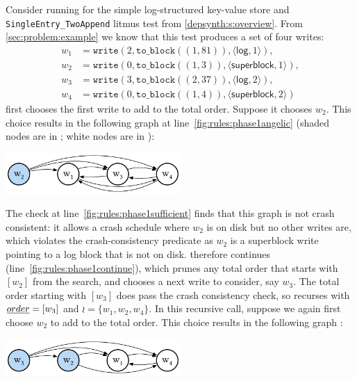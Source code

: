 \begin{example}\label{sec:alg:example}
  \normalfont
Consider running  for the simple log-structured key-value store
and \texttt{SingleEntry_TwoAppend} litmus test from \cref{depsynth:s:overview}.
From \cref{sec:problem:example} we know that this test produces a set \wr of four writes:
%
\begin{align*}
    w_1 &= \texttt{write}(2, \texttt{to_block}((1, 81)), \langle \textsf{log}, 1 \rangle), \\
    w_2 &= \texttt{write}(0, \texttt{to_block}((1, 3)),  \langle \textsf{superblock}, 1 \rangle), \\
    w_3 &= \texttt{write}(3, \texttt{to_block}((2, 37)), \langle \textsf{log}, 2 \rangle), \\
    w_4 &= \texttt{write}(0, \texttt{to_block}((1, 4)),  \langle \textsf{superblock}, 2 \rangle)
\end{align*}
%
\phaseone first chooses the first write to add to the total order.
Suppose it chooses $w_2$.
This choice results in the following graph \gr at line~\ref{fig:rules:phase1angelic}
(shaded nodes are in \ord; white nodes are in \wr):
%
\begin{center}\includegraphics[width=0.5\textwidth]{figs/sec4-1.pdf}\end{center}
%
The check at line~\ref{fig:rules:phase1sufficient}
finds that this graph is not crash consistent: it allows a crash schedule where $w_2$ is on disk but no other writes are,
which violates the crash-consistency predicate as $w_2$ is a superblock write pointing to a log block that is not on disk.
\phaseone therefore continues (line~\ref{fig:rules:phase1continue}),
which prunes any total order that starts with $[w_2]$ from the search,
and chooses a next write to consider, say $w_3$.
The total order starting with $[w_3]$ does pass the crash consistency check,
so \phaseone recurses with $\emph{order} = [w_3]$ and $\wr = \{w_1, w_2, w_4\}$.
In this recursive call,
suppose we again first choose $w_2$ to add to the total order.
This choice results in the following graph \gr:
%
\begin{center}\includegraphics[width=0.5\textwidth]{figs/sec4-2.pdf}\end{center}

\end{example}
